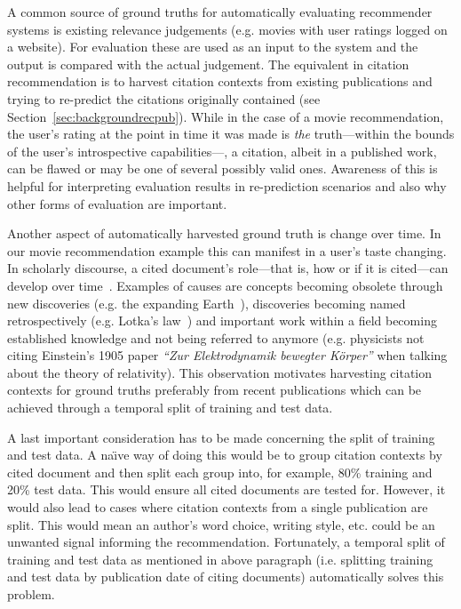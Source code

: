 
A common source of ground truths for automatically evaluating recommender systems is existing relevance judgements (e.g. movies with user ratings logged on a website). For evaluation these are used as an input to the system and the output is compared with the actual judgement. The equivalent in citation recommendation is to harvest citation contexts from existing publications and trying to re-predict the citations originally contained (see Section~\ref{sec:backgroundrecpub}). While in the case of a movie recommendation, the user's rating at the point in time it was made is \emph{the} truth---within the bounds of the user's introspective capabilities---, a citation, albeit in a published work, can be flawed or may be one of several possibly valid ones. Awareness of this is helpful for interpreting evaluation results in re-prediction scenarios and also why other forms of evaluation are important. %

Another aspect of automatically harvested ground truth is change over time. In our movie recommendation example this can manifest in a user's taste changing. In scholarly discourse, a cited document's role---that is, how or if it is cited---can develop over time~\cite{Swales1986,He2018}. Examples of causes are concepts becoming obsolete through new discoveries (e.g. the expanding Earth~\cite{Wu2011}), discoveries becoming named retrospectively (e.g. Lotka's law~\cite{Potter1981}) and important work within a field becoming established knowledge and not being referred to anymore (e.g. physicists not citing Einstein's 1905 paper \emph{``Zur Elektrodynamik bewegter Körper''} when talking about the theory of relativity). This observation motivates harvesting citation contexts for ground truths preferably from recent publications which can be achieved through a temporal split of training and test data. %

A last important consideration has to be made concerning the split of training and test data. A na\"{\i}ve way of doing this would be to group citation contexts by cited document and then split each group into, for example, 80\% training and 20\% test data. This would ensure all cited documents are tested for. However, it would also lead to cases where citation contexts from a single publication are split. This would mean an author's word choice, writing style, etc. could be an unwanted signal informing the recommendation. Fortunately, a temporal split of training and test data as mentioned in above paragraph (i.e. splitting training and test data by publication date of citing documents) automatically solves this problem.


